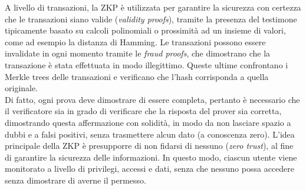 A livello di transazioni, la ZKP è utilizzata per garantire la sicurezza con certezza che le transazioni siano valide (\textit{validity proofs}), tramite la presenza del testimone tipicamente basato su calcoli polinomiali o
prossimità ad un insieme di valori, come ad esempio la distanza di Hamming. Le transazioni possono essere invalidate in ogni momento tramite le \textit{fraud proofs}, che dimostrano che la transazione è stata effettuata in modo illegittimo.
Queste ultime confrontano i Merkle trees delle transazioni e verificano che l'hash corrisponda a quella originale. \\

Di fatto, ogni prova deve dimostrare di essere completa, pertanto è necessario che il verificatore sia in grado di verificare che la risposta del prover sia corretta,
dimostrando questa affermazione con solidità, in modo da non lasciare spazio a dubbi e a falsi positivi, senza trasmettere alcun dato (a conoscenza zero).
L'idea principale della ZKP è presupporre di non fidarsi di nessuno (\textit{zero trust}), al fine di garantire la sicurezza delle informazioni. 
In questo modo, ciascun utente viene monitorato a livello di privilegi, accessi e dati, senza che nessuno possa accedere senza dimostrare di averne il permesso. \\


